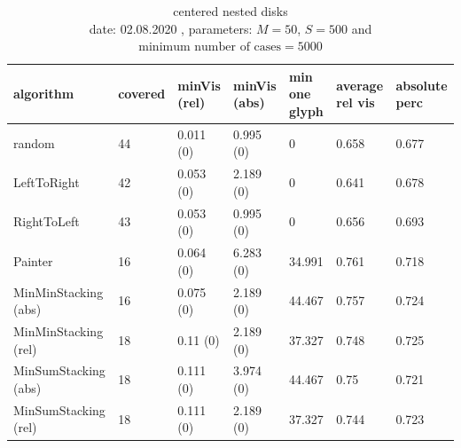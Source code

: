 \documentclass[a4paper,11pt]{article}
\begin{document}
\begin{table}[h]

    \begin{tabular}{| l || p{1.3cm} | p{1.7cm} | p{1.7cm} | p{1.5cm} | p{1.5cm} | p{1.5cm} |}
      \hline
      algorithm            & covered & minVis (rel) & minVis (abs) & min one glyph & average rel vis & absolute perc \\
      \hline
      random               &  {44}      & 0.011 (0)    & 0.995 (0)    & 0             & 0.658           & 0.677         \\

      LeftToRight          &  {42}      & 0.053 (0)    & 2.189 (0)    & 0             & 0.641           & 0.678         \\

      RightToLeft          &{  43}      & 0.053 (0)    & 0.995 (0)    & 0             & 0.656           & 0.693         \\

      Painter              & {  16 }     & 0.064 (0)    & 6.283 (0)    & 34.991        & 0.761           & 0.718
     \\

      MinMinStacking (abs) & {  16 }     & 0.075 (0)    & 2.189 (0)    & 44.467        & 0.757           & 0.724         \\


      MinMinStacking (rel) & { 18 }     & 0.11 (0)    & 2.189 (0)    & 37.327        & 0.748           & 0.725         \\

      MinSumStacking (abs) & 18     & 0.111 (0)    & 3.974 (0)    & {44.467}        & 0.75            & 0.721         \\

      MinSumStacking (rel) &{  18 }     & 0.111 (0)    & 2.189 (0)    & 37.327        & 0.744           & 0.723         \\

      \hline
    \end{tabular}
\caption{centered nested disks\\
date: 02.08.2020  , parameters: $M=50$, $S=500$ and $\text{minimum number of cases}=5000$  }
\end{table}
\end{document}
